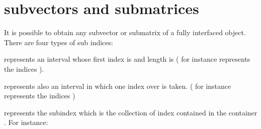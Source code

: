 \documentclass[a4paper,11pt,english]{sphinxmanual}
\begin{document}
\chapter{sub\sphinxhyphen{}vectors and sub\sphinxhyphen{}matrices}
\label{\detokenize{gmm/sub-matrix:sub-vectors-and-sub-matrices}}\label{\detokenize{gmm/sub-matrix:gmm-sub}}\label{\detokenize{gmm/sub-matrix::doc}}
\sphinxAtStartPar
It is possible to obtain any sub\sphinxhyphen{}vector or sub\sphinxhyphen{}matrix of a fully interfaced object. There are four types of sub indices:

\begin{sphinxVerbatim}[commandchars=\\\{\}]
 
\end{sphinxVerbatim}

\sphinxAtStartPar
represents an interval whose first index is  and length is  ( for instance  represents the indices ).

\begin{sphinxVerbatim}[commandchars=\\\{\}]
  
\end{sphinxVerbatim}

\sphinxAtStartPar
represents also an interval in which one index over  is taken. ( for instance  represents the indices )

\begin{sphinxVerbatim}[commandchars=\\\{\}]
 
\end{sphinxVerbatim}

\sphinxAtStartPar
represents the sub\sphinxhyphen{}index which is the collection of index contained in the container . For instance:

\begin{sphinxVerbatim}[commandchars=\\\{\}]
 
\PYG{p}{[}\PYG{p}{]}   \PYG{p}{[}\PYG{p}{]}   \PYG{p}{[}\PYG{p}{]}  
\end{sphinxVerbatim}
\end{document}
